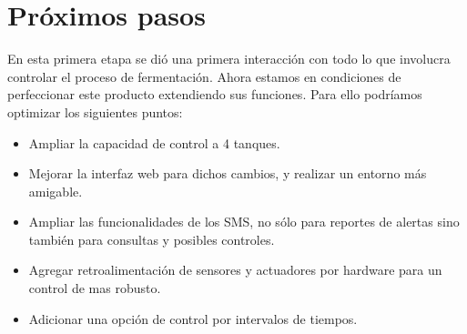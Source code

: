\section{Próximos pasos}

En esta primera etapa se dió una primera interacción con todo lo que involucra controlar el proceso de fermentación. Ahora estamos en condiciones de perfeccionar este producto extendiendo sus funciones.
Para ello podríamos optimizar los siguientes puntos:
  \begin{itemize}
    \item Ampliar la capacidad de control a 4 tanques.
    \item Mejorar la interfaz web para dichos cambios, y realizar un entorno más amigable.
    \item Ampliar las funcionalidades de los SMS, no sólo para reportes de alertas sino también para consultas y posibles controles. 
    \item Agregar retroalimentación de sensores y actuadores por hardware para un control de mas robusto.
    \item Adicionar una opción de control por intervalos de tiempos. 
   \end{itemize} 


